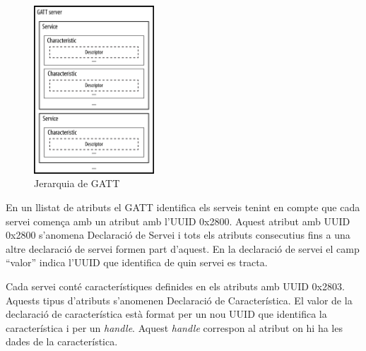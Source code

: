 \begin{figure}[h!]
	\begin{center}
		\includegraphics[width=0.4\textwidth]{./images/GATT_Hierarchy.png}
		\caption{Jerarquia de GATT \cite{GATT_Hierarchy}}
		\label{fig:Gatt_Hierarchy}
	\end{center}
\end{figure}

En un llistat de atributs el GATT identifica els serveis tenint en compte que cada servei comença amb un atribut amb l'UUID 0x2800.
Aquest atribut amb UUID 0x2800 s'anomena Declaració de Servei i tots els atributs consecutius fins a una altre declaració de servei formen part d'aquest.
En la declaració de servei el camp ``valor'' indica l'UUID que identifica de quin servei es tracta.

Cada servei conté característiques \cite{characteristics} definides en els atributs amb UUID 0x2803.
Aquests tipus d'atributs s'anomenen Declaració de Característica.
El valor de la declaració de característica està format per un nou UUID que identifica la característica i per un \textit{handle}.
Aquest \textit{handle} correspon al atribut on hi ha les dades de la característica.

